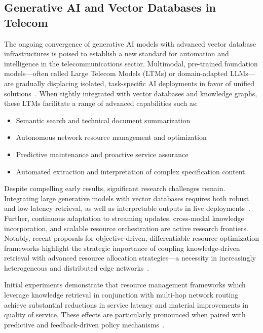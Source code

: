 \documentclass[sigconf]{acmart}
\begin{document}
\subsection{Generative AI and Vector Databases in Telecom}

The ongoing convergence of generative AI models with advanced vector database infrastructures is poised to establish a new standard for automation and intelligence in the telecommunications sector. Multimodal, pre-trained foundation models---often called Large Telecom Models (LTMs) or domain-adapted LLMs---are gradually displacing isolated, task-specific AI deployments in favor of unified solutions~\cite{ref51,ref511}. When tightly integrated with vector databases and knowledge graphs, these LTMs facilitate a range of advanced capabilities such as:

\begin{itemize}
    \item Semantic search and technical document summarization
    \item Autonomous network resource management and optimization
    \item Predictive maintenance and proactive service assurance
    \item Automated extraction and interpretation of complex specification content
\end{itemize}

Despite compelling early results, significant research challenges remain. Integrating large generative models with vector databases requires both robust and low-latency retrieval, as well as interpretable outputs in live deployments~\cite{ref20,ref21}. Further, continuous adaptation to streaming updates, cross-modal knowledge incorporation, and scalable resource orchestration are active research frontiers. Notably, recent proposals for objective-driven, differentiable resource optimization frameworks highlight the strategic importance of coupling knowledge-driven retrieval with advanced resource allocation strategies---a necessity in increasingly heterogeneous and distributed edge networks~\cite{ref48}.

Initial experiments demonstrate that resource management frameworks which leverage knowledge retrieval in conjunction with multi-hop network routing achieve substantial reductions in service latency and material improvements in quality of service. These effects are particularly pronounced when paired with predictive and feedback-driven policy mechanisms~\cite{ref48}.
\end{document}
